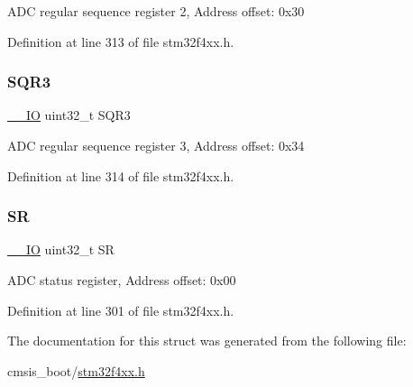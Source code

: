 A\+DC regular sequence register 2, Address offset\+: 0x30 

Definition at line 313 of file stm32f4xx.\+h.

\mbox{\label{struct_a_d_c___type_def_a97e40d9928fa25a5628d6442f0aa6c0f}} 
\subsubsection{\texorpdfstring{S\+Q\+R3}{SQR3}}
{\footnotesize\ttfamily \hyperlink{group___c_m_s_i_s__core__definitions_gaec43007d9998a0a0e01faede4133d6be}{\+\_\+\+\_\+\+IO} uint32\+\_\+t S\+Q\+R3}

A\+DC regular sequence register 3, Address offset\+: 0x34 

Definition at line 314 of file stm32f4xx.\+h.

\mbox{\label{struct_a_d_c___type_def_af6aca2bbd40c0fb6df7c3aebe224a360}} 
\subsubsection{\texorpdfstring{SR}{SR}}
{\footnotesize\ttfamily \hyperlink{group___c_m_s_i_s__core__definitions_gaec43007d9998a0a0e01faede4133d6be}{\+\_\+\+\_\+\+IO} uint32\+\_\+t SR}

A\+DC status register, Address offset\+: 0x00 

Definition at line 301 of file stm32f4xx.\+h.



The documentation for this struct was generated from the following file\+:\begin{DoxyCompactItemize}
\item 
cmsis\+\_\+boot/\hyperlink{stm32f4xx_8h}{stm32f4xx.\+h}\end{DoxyCompactItemize}
